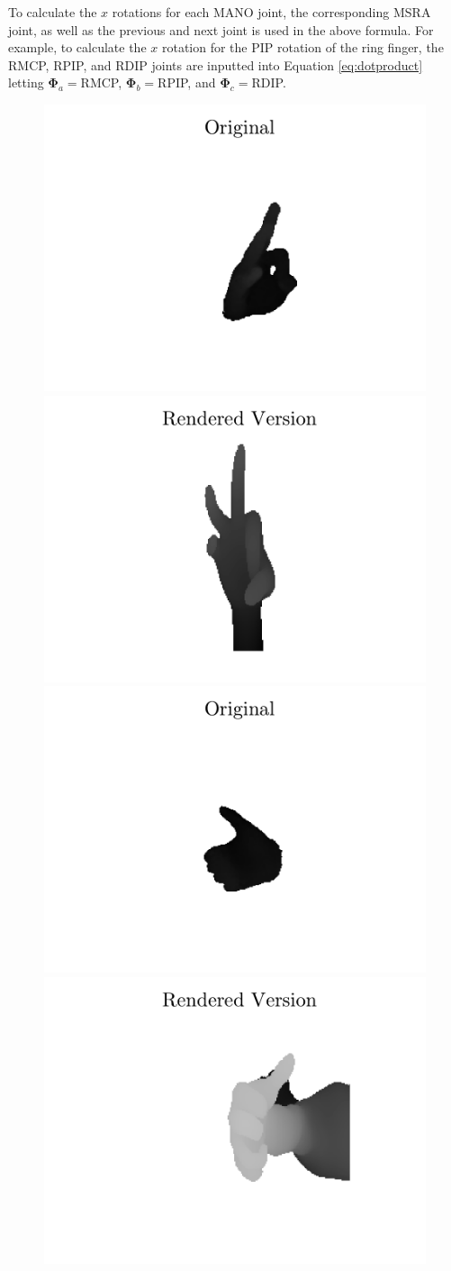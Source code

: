 To calculate the $x$ rotations for each MANO joint, the corresponding MSRA joint, as well as the previous and next joint is used in the above formula. For example, to calculate the $x$ rotation for the PIP rotation of the ring finger, the RMCP, RPIP, and RDIP joints are inputted into Equation \ref{eq:dotproduct} letting $\bm{\Phi}_a=$RMCP, $\bm{\Phi}_b=$RPIP, and $\bm{\Phi}_c=$RDIP.


\begin{figure}
    \includegraphics[width=0.48\linewidth]{figs/d_mano/original1.pdf}
    \includegraphics[width=0.48\linewidth]{figs/d_mano/rendered1.pdf}
    \includegraphics[width=0.48\linewidth]{figs/d_mano/original2.pdf}
    \includegraphics[width=0.48\linewidth]{figs/d_mano/rendered2.pdf}

\end{figure}
